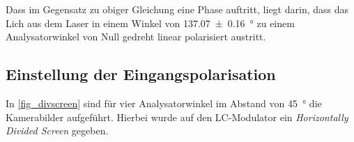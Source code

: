 \documentclass[
	a4paper,
	12pt,
	pagesize,
	ngerman
]{scrartcl}
\begin{document}
			Dass im Gegensatz zu obiger Gleichung eine Phase auftritt, liegt darin, dass das Lich aus dem Laser in einem Winkel von \SI{137,07\pm 0.16}{\degree} zu einem Analysatorwinkel von Null gedreht linear polarisiert austritt.



		\subsection{Einstellung der Eingangspolarisation}
		In \cref{fig_divscreen} sind für vier Analysatorwinkel im Abstand von \SI{45}{\degree} die Kamerabilder aufgeführt.
		Hierbei wurde auf den LC-Modulator ein \textit{Horizontally Divided Screen} gegeben.
\end{document}
